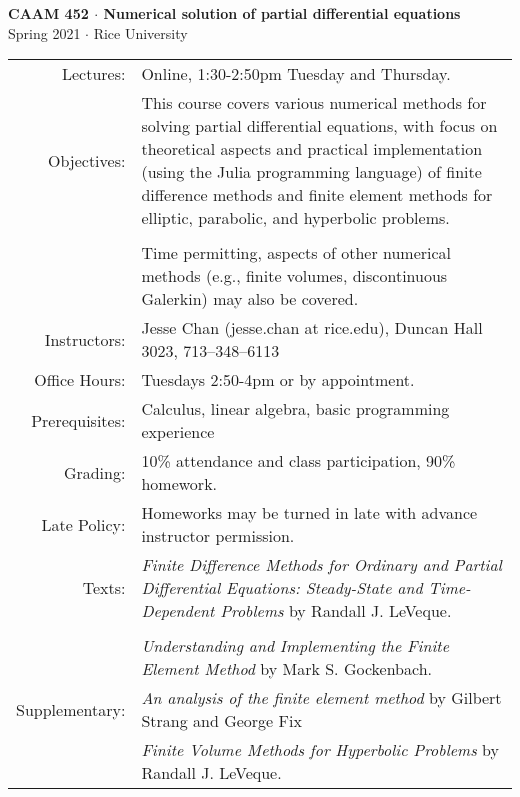 \documentclass[11pt]{article}
\begin{document}
\begin{center}
\large \textsf{\textbf{CAAM 452 $\cdot$ Numerical solution of partial differential equations}\\[0.5em]
Spring 2021 $\cdot$ Rice University}
\end{center}

\hspace*{-4em}
\begin{tabular}[b]{rp{35em}}

Lectures:		& Online, 1:30-2:50pm Tuesday and Thursday. \\[1em]

Objectives: 	& This course covers various numerical methods for solving partial differential equations, with focus on theoretical aspects and practical implementation (using the Julia programming language) of finite difference methods and finite element methods for elliptic, parabolic, and hyperbolic problems.\\ \\
			& Time permitting, aspects of other numerical methods (e.g., finite volumes, discontinuous Galerkin) may also be covered.\\[1em]

Instructors:  	 & Jesse Chan (jesse.chan at rice.edu), Duncan Hall 3023, 713--348--6113\\[1em]

Office Hours:	 & Tuesdays 2:50-4pm or by appointment.\\[1em]
               
Prerequisites:	 & Calculus, linear algebra, basic programming experience \\[1em]                           

Grading:		 & 10\% attendance and class participation, 90\% homework.\\[1em]

Late Policy:	 & Homeworks may be turned in late with advance instructor permission.\\[1em]

Texts:	  	 & \emph{Finite Difference Methods for Ordinary and Partial Differential Equations: Steady-State and Time-Dependent Problems}  by Randall J. LeVeque.\\ \\
			 & \emph{Understanding and Implementing the Finite Element Method}  by Mark S. Gockenbach. \\[1em] 

Supplementary: & \emph{An analysis of the finite element method} by Gilbert Strang and George Fix\\
			 & \emph{Finite Volume Methods for Hyperbolic Problems} by Randall J. LeVeque.\\[1em]
\end{tabular}
\end{document}
